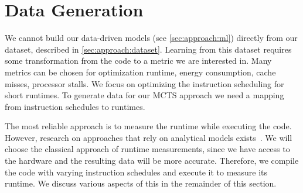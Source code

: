 \section{Data Generation}
\tobechecked
We cannot build our data-driven models (see \cref{sec:approach:ml}) directly from our dataset, described in \cref{sec:approach:dataset}.
Learning from this dataset requires some transformation from the code to a metric we are interested in.
Many metrics can be chosen for optimization \eg runtime, energy consumption, cache misses, processor stalls.
We focus on optimizing the instruction scheduling for short runtimes.
To generate data for our MCTS approach we need a mapping from instruction schedules to runtimes.

The most reliable approach is to measure the runtime while executing the code.
However, research on approaches that rely on analytical models exists~\cite{llvm:mca, mendis2019ithemal, taha2003instruction, laukemann2018automated}.
We will choose the classical approach of runtime measurements, since we have access to the hardware and the resulting data will be more accurate.
Therefore, we compile the code with varying instruction schedules and execute it to measure its runtime.
We discuss various aspects of this in the remainder of this section.

